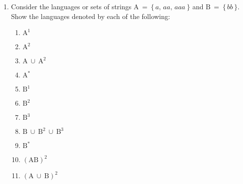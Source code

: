 \documentclass[11pt]{article}
\begin{document}

  \begin{enumerate}

    \addtolength{\itemsep}{6mm}

    \item %

          Consider the languages or sets of strings
          $ \mathrm{A} \: = \: \{ \, a, \, aa, \, aaa \: \} $
          and
          $ \mathrm{B} \: = \: \{ \, bb \, \} $.
          Show the languages denoted by each of the following:

          \vspace{-1mm}

          \begin{multicols}{3}

             \begin{enumerate}

               \addtolength{\itemsep}{3mm}

               \item $ \mathrm{ A^1 } $

               \item $ \mathrm{ A^2 } $

               \item $ \mathrm{ A \: \cup \: A^2 } $

               \item $ \mathrm{ A^* } $

               \item $ \mathrm{ B^1 } $

               \item $ \mathrm{ B^2 } $

               \item $ \mathrm{ B^3 } $

               \item $ \mathrm{ B \: \cup \: B^2 \: \cup \: B^3 } $

               \item $ \mathrm{ B^* } $

               \item $ \mathrm{ ( AB )^2 } $

               \item $ \mathrm{ ( A \: \cup \: B )^2 } $


\end{enumerate}
\end{multicols}
\end{enumerate}
\end{document}
